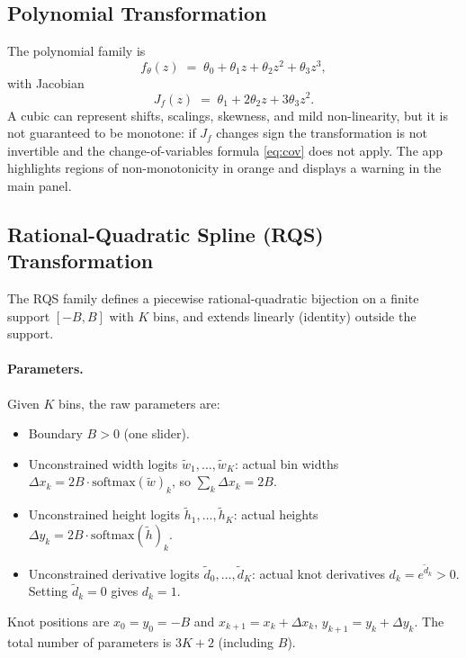 \documentclass[11pt,a4paper]{article}
\newcommand{\ft}{f_{\!\theta}}
\newcommand{\Jf}{J_{\!f}}
\begin{document}
\subsection{Polynomial Transformation}

The polynomial family is
\begin{equation}
  \ft(z) \;=\; \theta_0 + \theta_1 z + \theta_2 z^2 + \theta_3 z^3,
  \label{eq:poly}
\end{equation}
with Jacobian
\begin{equation}
  \Jf(z) \;=\; \theta_1 + 2\theta_2 z + 3\theta_3 z^2.
\end{equation}
A cubic can represent shifts, scalings, skewness, and mild non-linearity,
but it is not guaranteed to be monotone: if $\Jf$ changes sign the
transformation is not invertible and the change-of-variables formula
\eqref{eq:cov} does not apply.  The app highlights regions of
non-monotonicity in orange and displays a warning in the main panel.

\subsection{Rational-Quadratic Spline (RQS) Transformation}
\label{sec:rqs}

The RQS family \cite{durkan2019neural} defines a piecewise
rational-quadratic bijection on a finite support $[-B, B]$ with $K$
bins, and extends linearly (identity) outside the support.

\paragraph{Parameters.}
Given $K$ bins, the raw parameters are:
\begin{itemize}
  \item Boundary $B > 0$ (one slider).
  \item Unconstrained width logits $\tilde w_1,\ldots,\tilde w_K$: actual
        bin widths $\Delta x_k = 2B \cdot \mathrm{softmax}(\tilde w)_k$,
        so $\sum_k \Delta x_k = 2B$.
  \item Unconstrained height logits $\tilde h_1,\ldots,\tilde h_K$: actual
        heights $\Delta y_k = 2B \cdot \mathrm{softmax}(\tilde h)_k$.
  \item Unconstrained derivative logits $\tilde d_0,\ldots,\tilde d_K$:
        actual knot derivatives $d_k = e^{\tilde d_k} > 0$.
        Setting $\tilde d_k = 0$ gives $d_k = 1$.
\end{itemize}
Knot positions are $x_0 = y_0 = -B$ and
$x_{k+1} = x_k + \Delta x_k$, $y_{k+1} = y_k + \Delta y_k$.
The total number of parameters is $3K + 2$ (including $B$).
\end{document}
